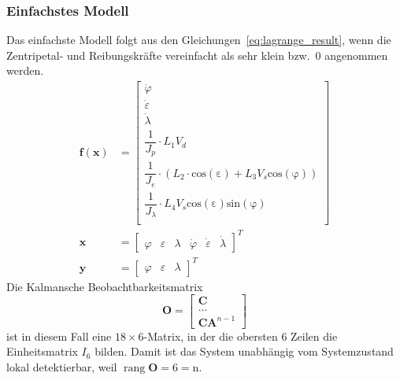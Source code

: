 \documentclass[10pt,twocolumn]{article}
\DeclareMathOperator{\rang}{rang}
\begin{document}
	\subsubsection{Einfachstes Modell}
	Das einfachste Modell folgt aus den Gleichungen~\ref{eq:lagrange_result}, wenn die Zentripetal- und Reibungskräfte vereinfacht als sehr klein bzw.\ 0 angenommen werden.
	\begin{align*}
	\bm f(\bm x) &= \begin{bmatrix}
	\dot \varphi \\
	\dot \varepsilon \\
	\dot \lambda  \\
	\dfrac{1}{J_p} \cdot L_1 V_d \\
	\dfrac{1}{J_e} \cdot (L_2 \cdot \mathrm{cos(\varepsilon)} + L_3 V_s \mathrm{cos(\varphi)}) \\
	\dfrac{1}{J_{\lambda}} \cdot L_4 V_s \mathrm{cos(\varepsilon)} \mathrm{sin(\varphi)} \\
	\end{bmatrix}\\
	\bm x &= \begin{bmatrix}
	\varphi & \varepsilon & \lambda & \dot \varphi & \dot \varepsilon & \dot \lambda 
	\end{bmatrix}^T \\
	\bm y &= \begin{bmatrix}
	\varphi & \varepsilon & \lambda 
	\end{bmatrix}^T
	\end{align*}
	Die Kalmansche Beobachtbarkeitsmatrix
	$$\bm O = \begin{bmatrix}
	\bm C \\
	\ldots \\
	\bm C \bm A^{n-1}
	\end{bmatrix}$$
	ist in diesem Fall eine $18\times 6$-Matrix, in der die obersten 6 Zeilen die Einheitsmatrix $I_6$ bilden.
	Damit ist das System unabhängig vom Systemzustand lokal detektierbar, weil $\rang \bm O = 6 = \mathrm{n}$.
\end{document}
